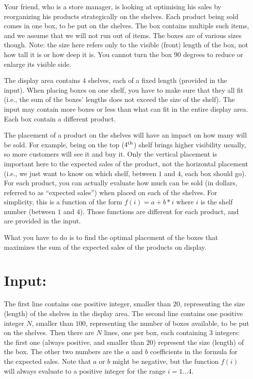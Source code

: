 
Your friend, who is a store manager, is looking at optimising his sales
by reorganizing his products strategically on the shelves. Each product
being sold comes in one box, to be put on the shelves. The box contains
multiple such items, and we assume that we will not run out of items.
The boxes are of various sizes though. Note: the size here refers only
to the visible (front) length of the box, not how tall it is or how deep
it is. You cannot turn the box $90$ degrees to reduce or enlarge its
visible side.

The display area contains $4$ shelves, each of a fixed length (provided in
the input). When placing boxes on one shelf, you have to make sure that
they all fit (i.e., the sum of the boxes' lengths does not exceed the
size of the shelf). The input may contain more boxes or less than what
can fit in the entire display area. Each box contain a different
product.

The placement of a product on the shelves will have an impact on how
many will be sold. For example, being on the top ($4\textsuperscript{th}$)
shelf brings higher visibility usually, so more customers will see it
and buy it. Only the vertical placement is important here to the
expected sales of the product, not the horizontal placement (i.e., we
just want to know on which shelf, between $1$ and $4$, each box should go).
For each product, you can actually evaluate how much can be sold (in
dollars, referred to as ``expected sales'') when placed on each of the
shelves. For simplicity, this is a function of the form $f(i) = a + b * i$
where $i$ is the shelf number (between $1$ and $4$). Those functions are
different for each product, and are provided in the input.

What you have to do is to find the optimal placement of the boxes that
maximizes the sum of the expected sales of the products on display.

\section*{Input:}
The first line contains one positive integer, smaller than $20$,
representing the size (length) of the shelves in the display area. The
second line contains one positive integer $N$, smaller than $100$,
representing the number of boxes available, to be put on the shelves.
Then there are $N$ lines, one per box, each containing $3$ integers: the
first one (always positive, and smaller than $20$) represent the size
(length) of the box. The other two numbers are the $a$ and $b$
coefficients in the formula for the expected sales. Note that $a$ or
$b$ might be negative, but the function $f(i)$ will always evaluate to a
positive integer for the range $i=1\dots 4$.


